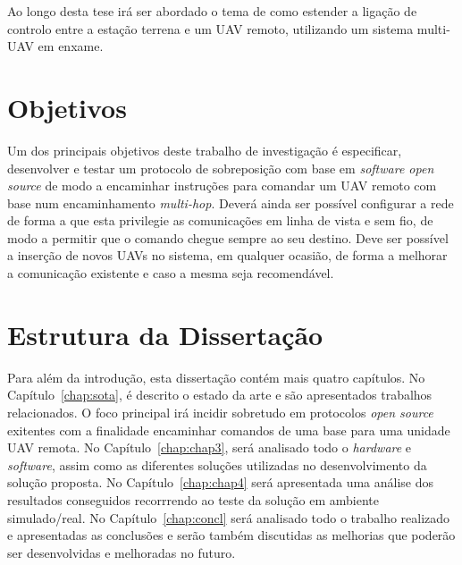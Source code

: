   Ao longo desta tese irá ser abordado o tema de como estender a ligação de controlo entre a estação terrena e um UAV remoto, utilizando um sistema multi-UAV em enxame.
  
\section{Objetivos}\label{sec:goals}

Um dos principais objetivos deste trabalho de investigação é especificar, desenvolver e testar um protocolo de sobreposição com base em \textit{software open source} de modo a encaminhar instruções para comandar um UAV remoto com base num encaminhamento \textit{multi-hop}. Deverá ainda ser possível configurar a rede de forma a que esta privilegie as comunicações em linha de vista e sem fio, de modo a permitir que o comando chegue sempre ao seu destino. Deve ser possível  a inserção de novos UAVs no sistema, em qualquer ocasião, de forma a melhorar a comunicação existente e caso a mesma seja recomendável.

\section{Estrutura da Dissertação}\label{sec:struct}

Para além da introdução, esta dissertação contém mais quatro capítulos.
No Capítulo~\ref{chap:sota}, é descrito o estado da arte e são
apresentados trabalhos relacionados. O foco principal irá incidir sobretudo em protocolos \textit{open source} exitentes com a finalidade encaminhar comandos de uma base para uma unidade UAV remota.
No Capítulo~\ref{chap:chap3}, será analisado todo o \textit{hardware} e \textit{software}, assim como as diferentes soluções utilizadas no desenvolvimento da solução proposta.
No Capítulo~\ref{chap:chap4} será apresentada uma análise dos resultados conseguidos recorrrendo ao teste da solução em ambiente simulado/real. 
No Capítulo~\ref{chap:concl} será analisado todo o trabalho realizado e apresentadas as conclusões e serão também discutidas as melhorias que poderão ser desenvolvidas e melhoradas no futuro.

